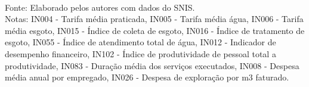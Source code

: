

\begin{table}[H] \centering 
\begin{minipage}{1\textwidth}
  \caption{Estatístiscas descritivas dos indicadores utilizados - 2019} 
  \label{tab:desc1} 
  \tiny
\footnotesize \\
	Fonte: Elaborado pelos autores com dados do SNIS. \\
	Notas: IN004 - Tarifa média praticada,
	IN005 - Tarifa média água,
	IN006 - Tarifa média esgoto,		
	IN015 - Índice de coleta de esgoto,
	IN016 - Índice de tratamento de esgoto,
	IN055 - Índice de atendimento total de água,	
	IN012 - Indicador de desempenho financeiro,
	IN102 - Índice de produtividade de pessoal total a produtividade,
	IN083 - Duração média dos serviços executados,	
	IN008 - Despesa média anual por empregado,
	IN026 - Despesa de exploração por m3 faturado.
\end{minipage}
\end{table} 











